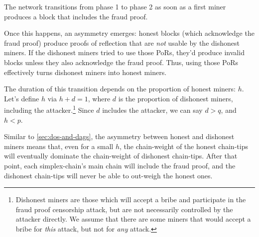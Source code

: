 The network transitions from phase 1 to phase 2 as soon as a first miner produces a block that includes the fraud proof.

Once this happens, an asymmetry emerges: honest blocks (which acknowledge the fraud proof) produce proofs of reflection that are \emph{not} usable by the dishonest miners.
If the dishonest miners tried to use those PoRs, they'd produce invalid blocks unless they also acknowledge the fraud proof.
Thus, using those PoRs effectively turns dishonest miners into honest miners.




The duration of this transition depends on the proportion of honest miners: $h$.
Let's define $h$ via $h + d = 1$, where $d$ is the proportion of dishonest miners, including the attacker.\footnote{
    Dishonest miners are those which will accept a bribe and participate in the fraud proof censorship attack, but are not necessarily controlled by the attacker directly.
    We assume that there are some miners that would accept a bribe for \emph{this} attack, but not for \emph{any} attack.
}
Since $d$ includes the attacker, we can say $d > q$, and $h < p$.

Similar to \autoref{sec:dos-and-dags}, the asymmetry between honest and dishonest miners means that, even for a small $h$, the chain-weight of the honest chain-tips will eventually dominate the chain-weight of dishonest chain-tips.
After that point, each simplex-chain's main chain will include the fraud proof, and the dishonest chain-tips will never be able to out-weigh the honest ones.

